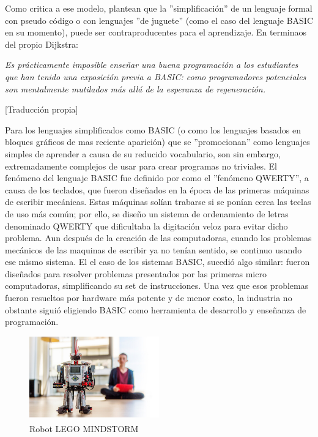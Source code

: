 Como critica a ese modelo, \cite{dijkstra2010que} plantean que la ''simplificación'' de un lenguaje formal con pseudo código o con lenguajes ''de juguete'' (como el caso del lenguaje BASIC en su momento), puede ser contraproducentes para el aprendizaje. En terminaos del propio Dijkstra:

\begin{center}
\textit{Es prácticamente imposible enseñar una buena programación a los estudiantes que han tenido una exposición previa a BASIC: como programadores potenciales son mentalmente mutilados más allá de la esperanza de regeneración.}
\end{center}[Traducción propia]

Para \cite{seymour_papert_desafio_1987} los lenguajes simplificados como BASIC (o como los lenguajes basados en bloques gráficos de mas reciente aparición) que se  ''promocionan'' como lenguajes simples de aprender a causa de su reducido vocabulario, son sin embargo, extremadamente complejos de usar para crear programas no triviales. El fenómeno del lenguaje BASIC fue definido por \cite{seymour_papert_desafio_1987} como el ''fenómeno QWERTY'', a causa de los teclados, que fueron diseñados en la época de las primeras máquinas de escribir mecánicas. Estas máquinas solían trabarse si se ponían cerca las teclas de uso más común; por ello, se diseño un sistema de ordenamiento de letras denominado QWERTY que dificultaba la digitación veloz para evitar dicho problema. Aun después de la creación de las computadoras, cuando los problemas mecánicos de las maquinas de escribir ya no tenían sentido, se continuo usando ese mismo sistema. El el caso de los  sistemas BASIC, sucedió algo similar: fueron diseñados para resolver problemas presentados por las primeras micro computadoras, simplificando su set de instrucciones. Una vez que esos problemas fueron resueltos por hardware más potente y de menor costo, la industria no obstante siguió eligiendo BASIC como herramienta de desarrollo y enseñanza de programación. 

 \begin{figure}
  \begin{center}
    \includegraphics[width=0.5\textwidth]{figuras/lego_mindstorm.jpg}
    \caption[Caption for LOF]{Robot LEGO\textsuperscript{\textregistered} MINDSTORM\textsuperscript{\textregistered}}
    \label{fig:legomindstorm }
  \end{center}
\end{figure}


